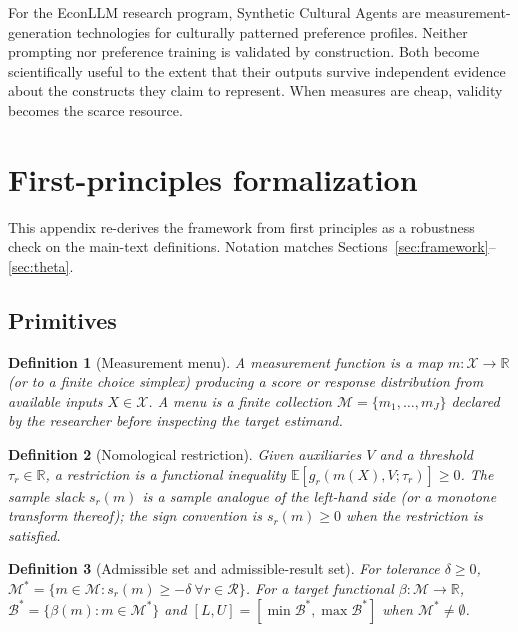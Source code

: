 \documentclass[10pt,letterpaper]{article}
\newtheorem{definition}{Definition}[section]
\newcommand{\M}{\ensuremath{\mathcal{M}}}
\newcommand{\E}{\mathbb{E}}
\newcommand{\Rset}{\mathcal{R}}
\newcommand{\Bset}{\mathcal{B}}
\begin{document}
For the EconLLM research program, Synthetic Cultural Agents are measurement-generation technologies for culturally patterned preference profiles.
Neither prompting nor preference training is validated by construction.
Both become scientifically useful to the extent that their outputs survive independent evidence about the constructs they claim to represent.
When measures are cheap, validity becomes the scarce resource.

\clearpage
\appendix
\section{First-principles formalization}
\label{app:first}
This appendix re-derives the framework from first principles as a robustness check on the main-text definitions.
Notation matches Sections~\ref{sec:framework}--\ref{sec:theta}.

\subsection{Primitives}
\begin{definition}[Measurement menu]
A \emph{measurement function} is a map $m:\mathcal{X}\to\mathbb{R}$ (or to a finite choice simplex) producing a score or response distribution from available inputs $X\in\mathcal{X}$.
A \emph{menu} is a finite collection $\M=\{m_1,\ldots,m_J\}$ declared by the researcher before inspecting the target estimand.
\end{definition}

\begin{definition}[Nomological restriction]
Given auxiliaries $V$ and a threshold $\tau_r\in\mathbb{R}$, a \emph{restriction} is a functional inequality
$\E[g_r(m(X),V;\tau_r)]\ge 0$.
The \emph{sample slack} $s_r(m)$ is a sample analogue of the left-hand side (or a monotone transform thereof); the sign convention is $s_r(m)\ge 0$ when the restriction is satisfied.
\end{definition}

\begin{definition}[Admissible set and admissible-result set]
For tolerance $\delta\ge 0$,
$\M^*=\{m\in\M:s_r(m)\ge-\delta\ \forall r\in\Rset\}$.
For a target functional $\beta:\M\to\mathbb{R}$,
$\Bset^*=\{\beta(m):m\in\M^*\}$ and
$[L,U]=[\min\Bset^*,\max\Bset^*]$ when $\M^*\neq\emptyset$.
\end{definition}
\end{document}
